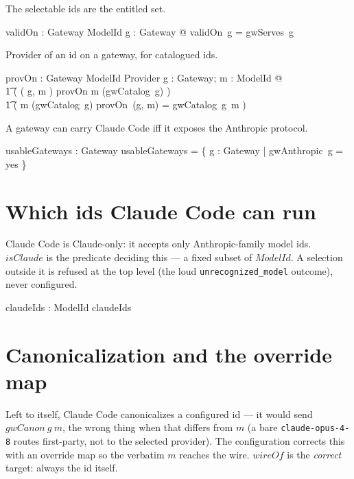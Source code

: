 \documentclass{article}
\begin{document}
The selectable ids are the entitled set.

\begin{axdef}
  validOn : Gateway \fun \power ModelId
\where
  \forall g : Gateway @ validOn~g = gwServes~g
\end{axdef}

Provider of an id on a gateway, for catalogued ids.

\begin{axdef}
  provOn : Gateway \cross ModelId \pfun Provider
\where
  \forall g : Gateway; m : ModelId @ \\
  \t1 ( ( g, m ) \in \dom provOn \iff m \in \dom (gwCatalog~g) ) \land \\
  \t1 ( m \in \dom (gwCatalog~g) \implies provOn~(g, m) = gwCatalog~g~m )
\end{axdef}

A gateway can carry Claude Code iff it exposes the Anthropic protocol.

\begin{axdef}
  usableGateways : \power Gateway
\where
  usableGateways = \{ g : Gateway | gwAnthropic~g = yes \}
\end{axdef}

\section{Which ids Claude Code can run}

Claude Code is Claude-only: it accepts only Anthropic-family model ids. $isClaude$
is the predicate deciding this --- a fixed subset of $ModelId$. A selection
outside it is refused at the top level (the loud \texttt{unrecognized\_model}
outcome), never configured.

\begin{axdef}
  claudeIds : \power ModelId
\where
  claudeIds \neq \emptyset
\end{axdef}

\section{Canonicalization and the override map}

Left to itself, Claude Code canonicalizes a configured id --- it would send
$gwCanon~g~m$, the wrong thing when that differs from $m$ (a bare
\texttt{claude-opus-4-8} routes first-party, not to the selected provider). The
configuration corrects this with an override map so the verbatim $m$ reaches the
wire. $wireOf$ is the \emph{correct} target: always the id itself.
\end{document}
